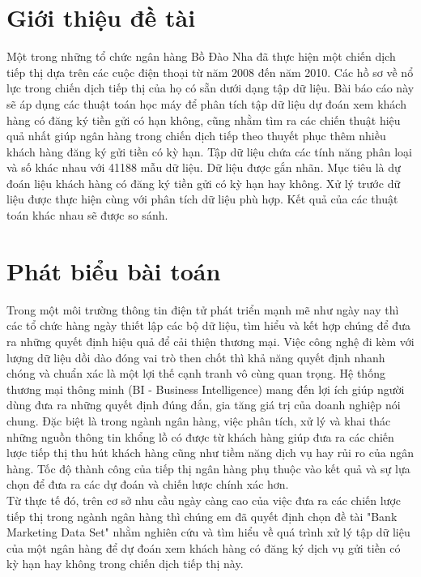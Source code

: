 \documentclass{report}
\begin{document}
\section{Giới thiệu đề tài}
 \fontsize{13}{14}\selectfont
 Một trong những tổ chức ngân hàng Bồ Đào Nha đã thực hiện một chiến dịch tiếp thị dựa trên các cuộc điện thoại từ năm 2008 đến năm 2010. Các hồ sơ về nổ lực trong chiến dịch tiếp thị của họ có sẵn dưới dạng tập dữ liệu. Bài báo cáo này sẽ áp dụng các thuật toán học máy để phân tích tập dữ liệu dự đoán xem khách hàng có đăng ký tiền gửi có hạn không, cũng nhằm tìm ra các chiến thuật hiệu quả nhất giúp ngân hàng trong chiến dịch tiếp theo thuyết phục thêm nhiều khách hàng đăng ký gửi tiền có kỳ hạn. Tập dữ liệu chứa các tính năng phân loại và số khác nhau với 41188 mẫu dữ liệu. Dữ liệu được gắn nhãn. Mục tiêu là dự đoán liệu khách hàng có đăng ký tiền gửi có kỳ hạn hay không. Xử lý trước dữ liệu được thực hiện cùng với phân tích dữ liệu phù hợp. Kết quả của các thuật toán khác nhau sẽ được so sánh.
 
\fontsize{14}{10}\selectfont
\section{Phát biểu bài toán}
 \fontsize{13}{14}\selectfont
Trong một môi trường thông tin điện tử phát triển mạnh mẽ như ngày nay thì các tổ chức hàng ngày thiết lập các bộ dữ liệu, tìm hiểu và kết hợp chúng để đưa ra những quyết định hiệu quả để cải thiện thương mại. Việc công nghệ đi kèm với lượng dữ liệu dồi dào đóng vai trò then chốt thì khả năng quyết định nhanh chóng và chuẩn xác là một lợi thế cạnh tranh vô cùng quan trọng. Hệ thống thương mại thông minh (BI - Business Intelligence) mang đến lợi ích giúp người dùng đưa ra những quyết định đúng đắn, gia tăng giá trị của doanh nghiệp nói chung. Đặc biệt là trong ngành ngân hàng, việc phân tích, xử lý và khai thác những nguồn thông tin khổng lồ có được từ khách hàng giúp đưa ra các chiến lược tiếp thị thu hút khách hàng cũng như tiềm năng dịch vụ hay rủi ro của ngân hàng. Tốc độ thành công của tiếp thị ngân hàng phụ thuộc vào kết quả và sự lựa chọn để đưa ra các dự đoán và chiến lược chính xác hơn.\\
\indent Từ thực tế đó, trên cơ sở nhu cầu ngày càng cao của việc đưa ra các chiến lược tiếp thị trong ngành ngân hàng thì chúng em đã quyết định chọn đề tài "Bank Marketing Data Set" nhằm nghiên cứu và tìm hiểu về quá trình xử lý tập dữ liệu của một ngân hàng để dự đoán xem khách hàng có đăng ký dịch vụ gửi tiền có kỳ hạn hay không trong chiến dịch tiếp thị này.
 
\end{document}
